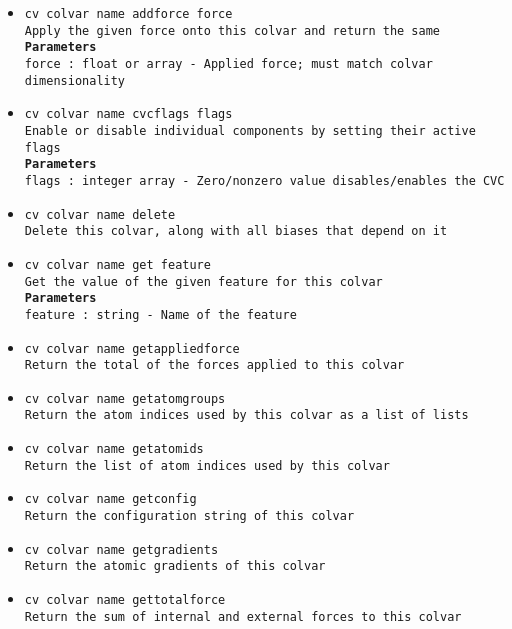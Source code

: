 \begin{itemize}
\item \texttt{cv colvar name addforce force}
\\
\texttt{Apply the given force onto this colvar and return the same}
\\
\texttt{\textbf{Parameters}}
\\
\texttt{force : float or array - Applied force; must match colvar dimensionality}
\item \texttt{cv colvar name cvcflags flags}
\\
\texttt{Enable or disable individual components by setting their active flags}
\\
\texttt{\textbf{Parameters}}
\\
\texttt{flags : integer array - Zero/nonzero value disables/enables the CVC}
\item \texttt{cv colvar name delete}
\\
\texttt{Delete this colvar, along with all biases that depend on it}
\item \texttt{cv colvar name get feature}
\\
\texttt{Get the value of the given feature for this colvar}
\\
\texttt{\textbf{Parameters}}
\\
\texttt{feature : string - Name of the feature}
\item \texttt{cv colvar name getappliedforce}
\\
\texttt{Return the total of the forces applied to this colvar}
\item \texttt{cv colvar name getatomgroups}
\\
\texttt{Return the atom indices used by this colvar as a list of lists}
\item \texttt{cv colvar name getatomids}
\\
\texttt{Return the list of atom indices used by this colvar}
\item \texttt{cv colvar name getconfig}
\\
\texttt{Return the configuration string of this colvar}
\item \texttt{cv colvar name getgradients}
\\
\texttt{Return the atomic gradients of this colvar}
\item \texttt{cv colvar name gettotalforce}
\\
\texttt{Return the sum of internal and external forces to this colvar}

\end{itemize}
